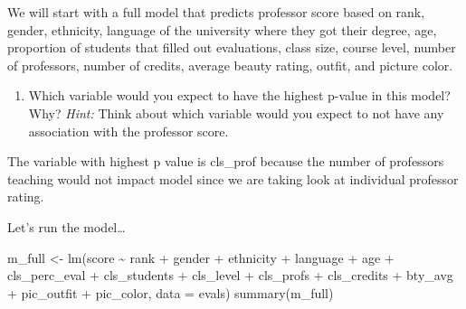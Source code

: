 \documentclass[
]{article}
\newenvironment{Shaded}{\begin{snugshade}}{\end{snugshade}}
\newcommand{\AttributeTok}[1]{\textcolor[rgb]{0.77,0.63,0.00}{#1}}
\newcommand{\FunctionTok}[1]{\textcolor[rgb]{0.00,0.00,0.00}{#1}}
\newcommand{\NormalTok}[1]{#1}
\newcommand{\OtherTok}[1]{\textcolor[rgb]{0.56,0.35,0.01}{#1}}
\newcommand{\SpecialCharTok}[1]{\textcolor[rgb]{0.00,0.00,0.00}{#1}}
\providecommand{\tightlist}{%
  \setlength{\itemsep}{0pt}\setlength{\parskip}{0pt}}
\begin{document}
We will start with a full model that predicts professor score based on
rank, gender, ethnicity, language of the university where they got their
degree, age, proportion of students that filled out evaluations, class
size, course level, number of professors, number of credits, average
beauty rating, outfit, and picture color.

\begin{enumerate}
\def\labelenumi{\arabic{enumi}.}
\setcounter{enumi}{10}
\tightlist
\item
  Which variable would you expect to have the highest p-value in this
  model? Why? \emph{Hint:} Think about which variable would you expect
  to not have any association with the professor score.
\end{enumerate}

The variable with highest p value is cls\_prof because the number of
professors teaching would not impact model since we are taking look at
individual professor rating.

Let's run the model\ldots{}

\begin{Shaded}
\begin{Highlighting}[]
\NormalTok{m\_full }\OtherTok{\textless{}{-}} \FunctionTok{lm}\NormalTok{(score }\SpecialCharTok{\textasciitilde{}}\NormalTok{ rank }\SpecialCharTok{+}\NormalTok{ gender }\SpecialCharTok{+}\NormalTok{ ethnicity }\SpecialCharTok{+}\NormalTok{ language }\SpecialCharTok{+}\NormalTok{ age }\SpecialCharTok{+}\NormalTok{ cls\_perc\_eval }
             \SpecialCharTok{+}\NormalTok{ cls\_students }\SpecialCharTok{+}\NormalTok{ cls\_level }\SpecialCharTok{+}\NormalTok{ cls\_profs }\SpecialCharTok{+}\NormalTok{ cls\_credits }\SpecialCharTok{+}\NormalTok{ bty\_avg }
             \SpecialCharTok{+}\NormalTok{ pic\_outfit }\SpecialCharTok{+}\NormalTok{ pic\_color, }\AttributeTok{data =}\NormalTok{ evals)}
\FunctionTok{summary}\NormalTok{(m\_full)}
\end{Highlighting}
\end{Shaded}
\end{document}
